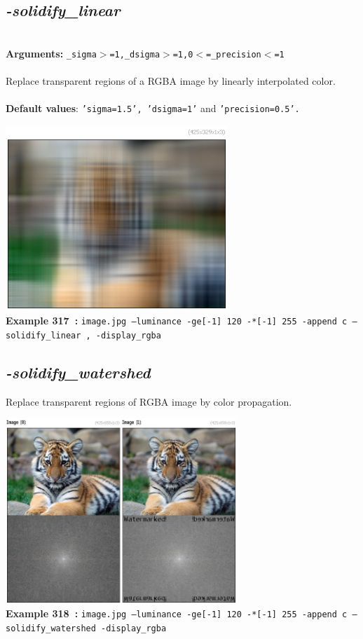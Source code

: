 \documentclass[a4paper,11pt,twoside]{book}
\begin{document}
\subsection{\emph{-solidify\_linear} }\vspace*{-0.5em}
~\\\textbf{Arguments: } 
{\small \texttt{\_sigma$>$=1,\_dsigma$>$=1,0$<$=\_precision$<$=1}}\\~\\
Replace transparent regions of a RGBA image by linearly interpolated color.
~\\~\\\textbf{Default values}: {\small \texttt{'sigma=1.5', 'dsigma=1'} and \texttt{'precision=0.5'.}}
\begin{center}\includegraphics[keepaspectratio=true,height=7cm,width=\textwidth]{img/gmic_def317.jpg}\\
{\footnotesize \textbf{Example 317~:} \texttt{image.jpg --luminance -ge[-1] 120 -*[-1] 255 -append c --solidify\_linear , -display\_rgba}}
\end{center}

\subsection{\emph{-solidify\_watershed} }\vspace*{-0.5em}
Replace transparent regions of RGBA image by color propagation.
\begin{center}\includegraphics[keepaspectratio=true,height=7cm,width=\textwidth]{img/gmic_def318.jpg}\\
{\footnotesize \textbf{Example 318~:} \texttt{image.jpg --luminance -ge[-1] 120 -*[-1] 255 -append c --solidify\_watershed -display\_rgba}}
\end{center}
\end{document}
